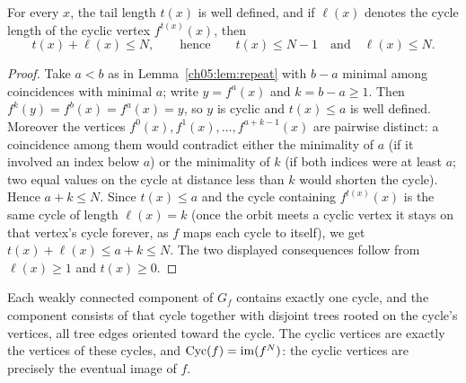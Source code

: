 \begin{lemma}
\label{ch05:lem:enters}
For every $x$, the tail length $t(x)$ is well defined, and if $\ell(x)$
denotes the cycle length of the cyclic vertex $f^{t(x)}(x)$, then
\[
  t(x) + \ell(x) \le N,
  \qquad\text{hence}\qquad
  t(x) \le N - 1
  \quad\text{and}\quad
  \ell(x) \le N .
\]
\end{lemma}

\begin{proof}
Take $a < b$ as in Lemma~\ref{ch05:lem:repeat} with $b - a$ minimal among
coincidences with minimal $a$; write $y = f^{a}(x)$ and $k = b - a \ge 1$.
Then $f^{k}(y) = f^{b}(x) = f^{a}(x) = y$, so $y$ is cyclic and $t(x) \le a$
is well defined. Moreover the vertices
$f^{0}(x), f^{1}(x), \dots, f^{a + k - 1}(x)$ are pairwise distinct: a
coincidence among them would contradict either the minimality of $a$ (if it
involved an index below $a$) or the minimality of $k$ (if both indices were
at least $a$; two equal values on the cycle at distance less than $k$ would
shorten the cycle). Hence $a + k \le N$. Since $t(x) \le a$ and the cycle
containing $f^{t(x)}(x)$ is the same cycle of length $\ell(x) = k$
(once the orbit meets a cyclic vertex it stays on that vertex's cycle
forever, as $f$ maps each cycle to itself), we get
$t(x) + \ell(x) \le a + k \le N$. The two displayed consequences follow
from $\ell(x) \ge 1$ and $t(x) \ge 0$.
\end{proof}

\begin{proposition}
\label{ch05:prop:shape}
Each weakly connected component of $G_f$ contains exactly one cycle, and the
component consists of that cycle together with disjoint trees rooted on the
cycle's vertices, all tree edges oriented toward the cycle. The cyclic
vertices are exactly the vertices of these cycles, and
$\mathrm{Cyc}(f) = \mathrm{im}(f^{N})$: the cyclic vertices are precisely the
eventual image of $f$.
\end{proposition}

